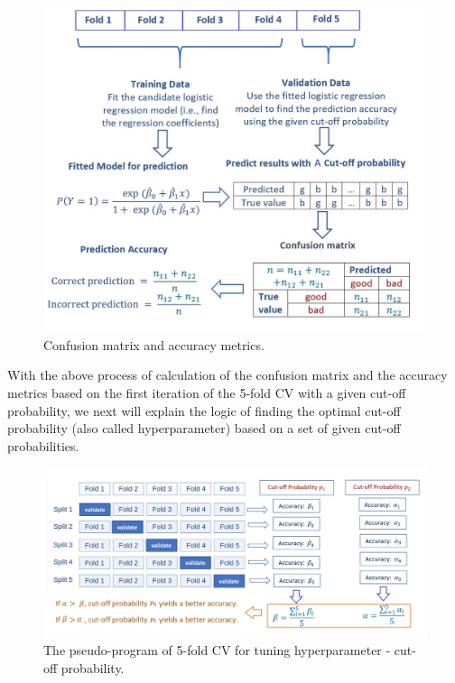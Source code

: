 \documentclass[
]{book}
\begin{document}
\begin{figure}

{\centering \includegraphics[width=0.8\linewidth]{img06/w06-CalculateConfusionMatrix} 

}

\caption{Confusion matrix and accuracy metrics.}\label{fig:unnamed-chunk-121}
\end{figure}

With the above process of calculation of the confusion matrix and the accuracy metrics based on the first iteration of the 5-fold CV with a given cut-off probability, we next will explain the logic of finding the optimal cut-off probability (also called hyperparameter) based on a set of given cut-off probabilities.

\begin{figure}

{\centering \includegraphics[width=0.8\linewidth]{img06/w06-cut-off-prob-CV} 

}

\caption{The pseudo-program of 5-fold CV for tuning hyperparameter - cut-off probability.}\label{fig:unnamed-chunk-122}
\end{figure}
\end{document}
